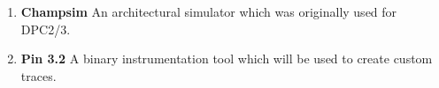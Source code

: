 
\begin{enumerate}
	\item \textbf{Champsim} An architectural simulator which was originally used for DPC2/3.
	\item \textbf{Pin 3.2} A binary instrumentation tool which will be used to create custom traces.
\end{enumerate}